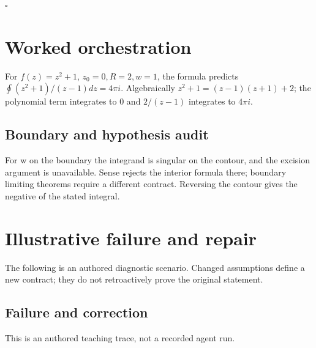 \documentclass[preprint,12pt,aps,pra,showkeys,amsmath,amssymb,superscriptaddress,floatfix]{revtex4-2}
\theoremstyle{definition}
\theoremstyle{remark}
\begin{document}
\hfill$\square$

\section{Worked orchestration}

For \(f(z)=z^{2}+1\), \(z_{0}=0,R=2,w=1\), the formula predicts
\(\oint (z^{2}+1)/(z-1)dz=4\pi i\). Algebraically
\(z^{2}+1=(z-1)(z+1)+2\); the polynomial term integrates to 0 and
\(2/(z-1)\) integrates to \(4\pi i\).

\subsection{Boundary and hypothesis audit}

For w on the boundary the integrand is singular on the contour, and the
excision argument is unavailable. Sense rejects the interior formula
there; boundary limiting theorems require a different contract.
Reversing the contour gives the negative of the stated integral.

\section{Illustrative failure and repair}

The following is an authored diagnostic scenario. Changed assumptions
define a new contract; they do not retroactively prove the original
statement.

\subsection{Failure and correction}
This is an authored teaching trace, not a recorded agent run.
\end{document}
